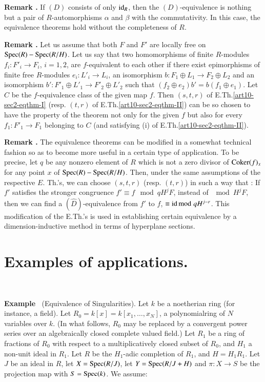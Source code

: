 \medskip
\noindent
{\bf Remark .\label{art10-sec2-rem2.4.1}}
If $(D)$ consists of only $\operatorname{\mathrm{id}}_{R}$, then the $(D)$-equivalence is nothing but a pair of $R$-automorphisms $\alpha$ and $\beta$ with the commutativity. In this case, the equivalence theorems hold without the completeness of $R$.

\medskip
\noindent
{\bf Remark .\label{art10-sec2-rem2.4.2}}
Let us assume that both $F$ and $F'$ are locally free on $\operatorname{Spec} (R)-\operatorname{Spec} (R/H)$. Let us say that two homomorphisms of finite $R$-modules $f_{i}:F'_{i}\to F_{i}$, $i=1,2$, are $f$-equivalent to each other if there exist epimorphisms of finite free $R$-modules $e_{i}:L'_{i}\to L_{i}$, an isomorphism $b:F_{1}\oplus L_{1}\to F_{2}\oplus L_{2}$ and an isomorphism $b':F'_{1}\oplus L'_{1}\to F'_{2}\oplus L'_{2}$ such that $(f_{2}\oplus e_{2})b'=b(f_{1}\oplus e_{1})$. Let $C$ be the $f$-equivalence class of the given map $f$. Then $(s,t,r)$ of E.Th.\ref{art10-sec2-eqthm-I} (resp. $(t,r)$ of E.Th.\ref{art10-sec2-eqthm-II}) can be so chosen to have the property of the theorem not only for the given $f$ but also for every $f_{1}:F'_{1}\to F_{1}$ belonging to $C$ (and satisfying (i) of E.Th.\ref{art10-sec2-eqthm-II}).

\medskip
\noindent
{\bf Remark .\label{art10-sec2-rem2.4.3}}
The equivalence theorems can be modified in a somewhat technical fashion so as to become more useful in a certain type of application. To be precise, let $q$ be any nonzero element of $R$ which is not a zero divisor of $\operatorname{\mathrm{Coker}}(f)_{x}$ for any point $x$ of $\operatorname{Spec} (R)-\operatorname{Spec}(R/H)$. Then, under the same assumptions of the respective $E$. Th.'s, we can choose $(s,t,r)$ (resp. $(t,r)$) in such a way that : If $f'$ satisfies the stronger congruence $f'\equiv f\mod qH^{j}F$, instead of $\mod H^{j}F$, then we can find a $(\widehat{D})$-equivalence from $f'$ to $f$, $\equiv \operatorname{\mathrm{id}}{\rm{mod}}\kern.3em qH^{j-r}$. This modification of the E.Th.'s is used in establishing certain equivalence by a dimension-inductive method in terms of hyperplane sections.

\section{Examples of applications.}\label{art10-sec3}
~

\medskip
\noindent
{\bf Example \label{art10-sec3-exam-I}}~(Equivalence of Singularities).
Let $k$ be a noetherian ring (for instance, a field). Let $R_{0}=k[x]=k[x_{1},\ldots,x_{N}]$, a polynomial\pageoriginale ring of $N$ variables over $k$. (In what follows, $R_{0}$ may be replaced by a convergent power series over an algebraically closed complete valued field.) Let $R_{1}$ be a ring of fractions of $R_{0}$ with respect to a multiplicatively closed subset of $R_{0}$, and $H_{1}$ a non-unit ideal in $R_{1}$. Let $R$ be the $H_{1}$-adic completion of $R_{1}$, and $H=H_{1}R_{1}$. Let $J$ be an ideal in $R$, let $X=\operatorname{Spec} (R/J)$, let $Y=\operatorname{Spec} (R/J+H)$ and $\pi:X\to S$ be the projection map with $S=\operatorname{Spec} (k)$. We assume:

